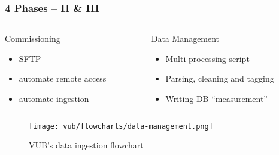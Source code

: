\begin{frame}
    \frametitle{4 Phases -- II \& III}
    \vspace*{\fill}
    \begin{columns}[onlytextwidth, c]
        \begin{column}{.47\textwidth}
            \begin{exampleblock}{Commissioning}
                \begin{itemize}
                    \item \ac{SFTP}
                    \item automate remote access
                    \item automate ingestion
                \end{itemize}
            \end{exampleblock}
        \end{column}
        \begin{column}{.52\textwidth}
            \begin{exampleblock}{Data Management}
                \begin{itemize}
                    \item Multi processing script
                    \item Parsing, cleaning and tagging %
                    \item Writing DB ``measurement''  %
                \end{itemize}
            \end{exampleblock}
        \end{column}
    \end{columns}
    \begin{figure}[ht]
        \texttt{[image: vub/flowcharts/data-management.png]}
        \caption{\acs{VUB}'s data ingestion flowchart}
    \end{figure}
    \vspace*{\fill}
\end{frame}

